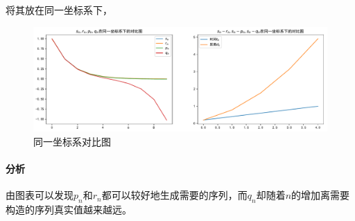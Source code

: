 将其放在同一坐标系下，

\begin{figure}[H]
	\centering
	\caption{同一坐标系对比图}
	\includegraphics[width=\linewidth]{fig3.pdf}
\end{figure}

\paragraph{分析}
由图表可以发现$p_n$和$r_n$都可以较好地生成需要的序列，而$q_n$却随着$n$的增加离需要构造的序列真实值越来越远。
